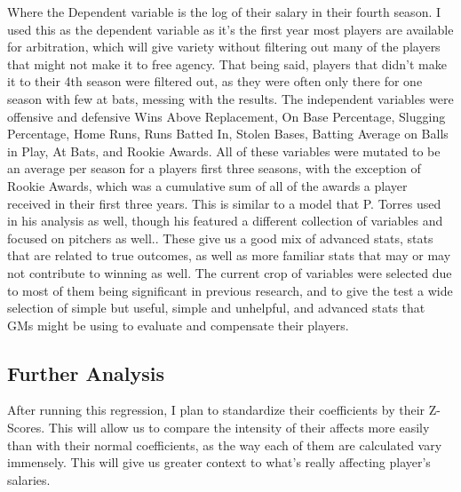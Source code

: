 \documentclass{article}
\begin{document}
Where the Dependent variable is the log of their salary in their fourth season. I used this as the dependent variable as it's the first year most players are available for arbitration, which will give variety without filtering out many of the players that might not make it to free agency. That being said, players that didn't make it to their 4th season were filtered out, as they were often only there for one season with few at bats, messing with the results. The independent variables were offensive and defensive Wins Above Replacement, On Base Percentage, Slugging Percentage, Home Runs, Runs Batted In, Stolen Bases, Batting Average on Balls in Play, At Bats, and Rookie Awards. All of these variables were mutated to be an average per season for a players first three seasons, with the exception of Rookie Awards, which was a cumulative sum of all of the awards a player received in their first three years.  This is similar to a model that P. Torres used in his analysis as well, though his featured a different collection of variables and focused on pitchers as well.\citet{torres2020mlbaseball}. These give us a good mix of advanced stats, stats that are related to true outcomes, as well as more familiar stats that may or may not contribute to winning as well. The current crop of variables were selected due to most of them being significant in previous research, and to give the test a wide selection of simple but useful, simple and unhelpful, and advanced stats that GMs might be using to evaluate and compensate their players.
\subsection{Further Analysis}
After running this regression, I plan to standardize their coefficients by their Z-Scores. This will allow us to compare the intensity of their affects more easily than with their normal coefficients, as the way each of them are calculated vary immensely. This will give us greater context to what's really affecting player's salaries.
\end{document}
